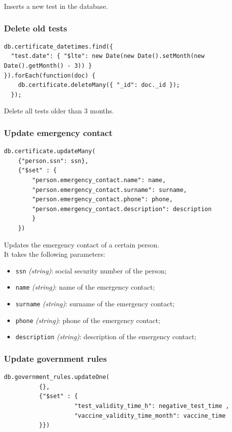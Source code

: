 \documentclass[12pt, a4paper]{article}
\begin{document}
\noindent
Inserts a new test in the database. \\

\subsubsection{Delete old tests}
\begin{tcolorbox}[fontupper=\scriptsize]
    \begin{verbatim}
db.certificate_datetimes.find({ 
  "test.date": { "$lte": new Date(new Date().setMonth(new Date().getMonth() - 3)) }
}).forEach(function(doc) {
    db.certificate.deleteMany({ "_id": doc._id });
  });
      \end{verbatim}
\end{tcolorbox}

\noindent
Delete all tests older than 3 months.

\subsubsection{Update emergency contact}
\begin{tcolorbox}[fontupper=\scriptsize]
    \begin{verbatim}
db.certificate.updateMany(
	{"person.ssn": ssn},
	{"$set" : {
		"person.emergency_contact.name": name,
		"person.emergency_contact.surname": surname,
		"person.emergency_contact.phone": phone,
		"person.emergency_contact.description": description	
		}
	})
      \end{verbatim}
\end{tcolorbox}

\noindent
Updates the emergency contact of a certain person. \\
It takes the following parameters:
\begin{itemize}
    \item \texttt{ssn} \emph{(string)}: social security number of the person;
    \item \texttt{name} \emph{(string)}: name of the emergency contact;
    \item \texttt{surname} \emph{(string)}: surname of the emergency contact;
    \item \texttt{phone} \emph{(string)}: phone of the emergency contact;
    \item \texttt{description} \emph{(string)}: description of the emergency contact;
 \end{itemize}


\subsubsection{Update government rules} 
\begin{tcolorbox}[fontupper=\scriptsize]
    \begin{verbatim}
db.government_rules.updateOne(
          {},
          {"$set" : { 
                    "test_validity_time_h": negative_test_time , 
                    "vaccine_validity_time_month": vaccine_time
          }})
      \end{verbatim}
\end{tcolorbox}
\end{document}
